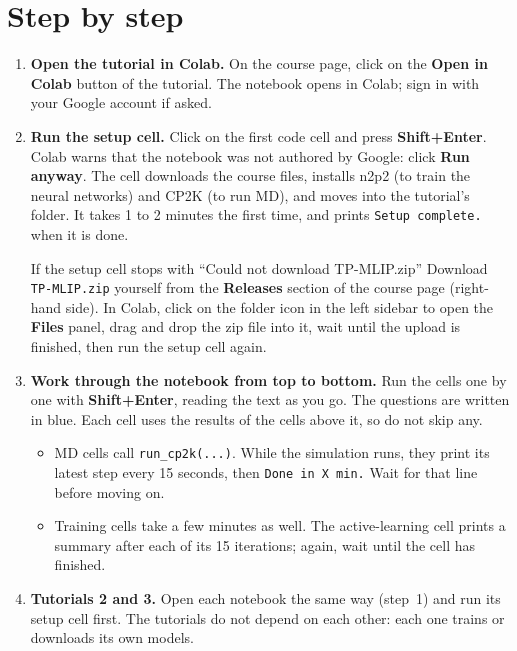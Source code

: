 \documentclass[11pt,a4paper]{article}
\newcommand{\menu}[1]{\textsf{\textbf{#1}}}
\begin{document}
\section{Step by step}

\begin{enumerate}[leftmargin=*,itemsep=4pt]
  \item \textbf{Open the tutorial in Colab.} On the course page, click on the
        \menu{Open in Colab} button of the tutorial. The notebook opens in
        Colab; sign in with your Google account if asked.

  \item \textbf{Run the setup cell.} Click on the first code cell and press
        \menu{Shift+Enter}. Colab warns that the notebook was not authored
        by Google: click \menu{Run anyway}. The cell downloads the course files, installs n2p2 (to
        train the neural networks) and CP2K (to run MD), and moves into the
        tutorial's folder. It takes 1 to 2 minutes the first time, and prints
        \texttt{Setup complete.} when it is done.

        \begin{warnbox}{If the setup cell stops with ``Could not download TP-MLIP.zip''}
        Download \texttt{TP-MLIP.zip} yourself from the \menu{Releases}
        section of the course page (right-hand side). In Colab, click on the
        folder icon in the left sidebar to open the \menu{Files} panel, drag
        and drop the zip file into it, wait until the upload is finished, then
        run the setup cell again.
        \end{warnbox}

  \item \textbf{Work through the notebook from top to bottom.} Run the cells
        one by one with \menu{Shift+Enter}, reading the text as you go. The
        questions are written in blue. Each cell uses the results of the cells
        above it, so do not skip any.
        \begin{itemize}[nosep]
          \item MD cells call \texttt{run\_cp2k(...)}. While the simulation
                runs, they print its latest step every 15 seconds, then
                \texttt{Done in X min.} Wait for that line before moving on.
          \item Training cells take a few minutes as well. The
                active-learning cell prints a summary after each of its 15
                iterations; again, wait until the cell has finished.
        \end{itemize}

  \item \textbf{Tutorials 2 and 3.} Open each notebook the same way
        (step~1) and run its setup cell first. The tutorials do not depend on
        each other: each one trains or downloads its own models.
\end{enumerate}
\end{document}
